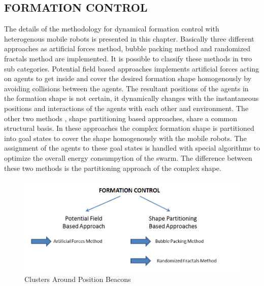 \documentclass[twoside]{article}
\begin{document}
\subsection{FORMATION CONTROL}		
  The details of the methodology for dynamical formation control with heterogenous mobile robots is presented in this chapter. Basically three different approaches as artificial forces method, bubble packing method and randomized fractals method are implemented. It is possible to classify these methods in two sub categories. Potential field based approaches implements artificial forces acting on agents to get inside and cover the desired formation shape homogenously by avoiding collisions between the agents. The resultant positions of the agents in the formation shape is not certain, it dynamically changes with the instantaneous positions and interactions of the agents with each other and environment. The other two methods , shape partitioning based approaches, share a common structural basis. In these approaches the complex formation shape is partitioned into goal states to cover the shape homogenously with the mobile robots. The assignment of the agents to these goal states is handled with special algorithms to optimize the overall energy consumpytion of the swarm. The difference between these two methods is the partitioning approach of the complex shape. 
		
	\begin{figure}[H]
		\caption{Clusters Around Position Beacons}
		\centering
		\includegraphics[scale = 0.60]{methods}
	\end{figure}

		
		
\end{document}
